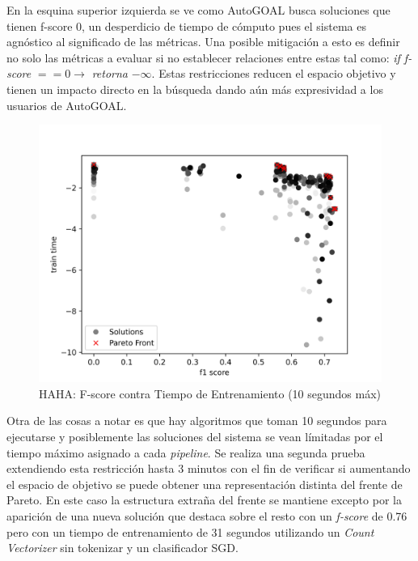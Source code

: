 En la esquina superior izquierda se ve como AutoGOAL busca soluciones que tienen f-score 0, un desperdicio de tiempo de c\'omputo pues el sistema es agn\'ostico al significado de las m\'etricas. Una posible mitigaci\'on a esto es definir no solo las m\'etricas a evaluar si no establecer relaciones entre estas tal como: \textit{if f-score} $== 0 \rightarrow $ \textit{retorna} $-\infty$. Estas restricciones reducen el espacio objetivo y tienen un impacto directo en la b\'usqueda dando a\'un m\'as expresividad a los usuarios de AutoGOAL.

\begin{figure}[ht]
    \centering
    \includegraphics[scale=0.65]{Pictures/haha_fscore_vs_time.jpg}
    \caption{HAHA: F-score contra Tiempo de Entrenamiento (10 segundos m\'ax)}
    \label{impl:fig:haha:fscore_vs_time}
\end{figure}

Otra de las cosas a notar es que hay algoritmos que toman 10 segundos para ejecutarse y posiblemente las soluciones del sistema se vean l\'imitadas por el tiempo m\'aximo asignado a cada \textit{pipeline}. Se realiza una segunda prueba extendiendo esta restricci\'on hasta 3 minutos con el fin de verificar si aumentando el espacio de objetivo se puede obtener una representaci\'on distinta del frente de Pareto. En este caso la estructura extra\~na del frente se mantiene excepto por la aparici\'on de una nueva soluci\'on que destaca sobre el resto con un \textit{f-score} de 0.76 pero con un tiempo de entrenamiento de 31 segundos utilizando un \textit{Count Vectorizer} sin tokenizar y un  clasificador SGD.

